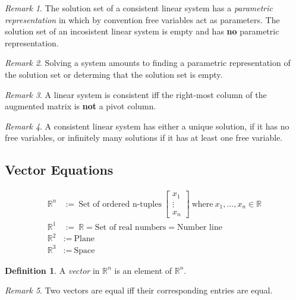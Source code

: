 \documentclass{article}
\theoremstyle{definition}
\newtheorem{definition}{Definition}[section]
\theoremstyle{remark}
\newtheorem*{remark}{Remark}
\theoremstyle{remark}
\theoremstyle{remark}
\newtheorem*{it follows}{It follows}
\begin{document}
\begin{remark}
  The solution set of a consistent linear system has a \textit{parametric representation} in which by convention free variables act as parameters. The solution set of an incosistent linear system is empty and has \textbf{no} parametric representation.
\end{remark}

\begin{remark}
  Solving a system amounts to finding a parametric representation of the solution set or determing that the solution set is empty.
\end{remark}

\begin{remark}
  A linear system is consistent iff the right-most column of the augmented matrix is \textbf{not} a pivot column.
\end{remark}

\begin{remark}
  A consistent linear system has either a unique solution, if it has no free variables, or infinitely many solutions if it has at least one free variable.
\end{remark}

\subsection{Vector Equations}

\begin{align*}
  \mathbb{R}^n &:=\ \text{Set of ordered n-tuples}\
  \begin{bmatrix}
    x_1 \\
    \vdots  \\
    x_n
  \end{bmatrix}\
  \text{where}\ x_1, \dots, x_n \in \mathbb{R} \\
  \mathbb{R}^1 &:=\ \mathbb{R} = \text{Set of real numbers} =\text{Number line} \\
  \mathbb{R}^2 &:=\ \text{Plane} \\
  \mathbb{R}^3 &:=\ \text{Space}
\end{align*}

\begin{definition}
  A \textit{vector} in $\mathbb{R}^n$ is an element of $\mathbb{R}^n$.
\end{definition}

\begin{remark}
  Two vectors are equal iff their corresponding entries are equal.
\end{remark}
\end{document}
